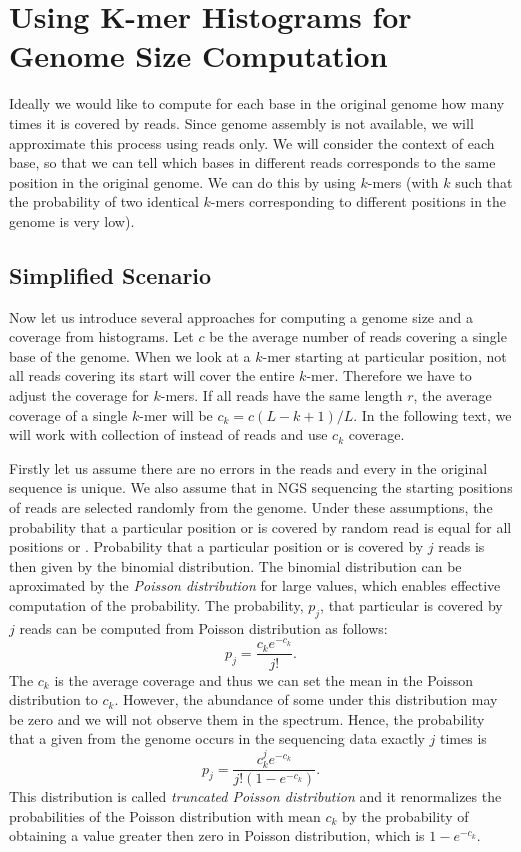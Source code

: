 \section[K-mer Histograms]{Using K-mer Histograms for Genome Size Computation}\label{sec:kmerhist}

Ideally we would like to compute for each base in the original genome how many times it is covered by reads. Since genome assembly is not available, we will approximate this process using reads only. We will consider the context of each base, so that we can tell which bases in different reads corresponds to the same position in the original genome. We can do this by using $k$-mers (with $k$ such that the probability of two identical $k$-mers corresponding to different positions in the genome is very low).

\subsection{Simplified Scenario}

Now let us introduce several approaches for computing a genome size and a coverage from \kmer histograms.
Let $c$ be the average number of reads covering a single base of the genome. When we look at a $k$-mer starting at particular position, not all reads covering its start will cover the entire $k$-mer.
Therefore we have to adjust the coverage for $k$-mers.
If all reads have the same length $r$, the average coverage of a single $k$-mer will be $c_k = c (L - k + 1)/L$.
In the following text, we will work with collection of \kmers instead of reads and use $c_k$ coverage.

Firstly let us assume there are no errors in the reads and every \kmer in the original sequence is unique.
We also assume that in NGS sequencing the starting positions of reads are selected randomly from the genome.
Under these assumptions, the probability that a particular position or \kmer is covered by random read is equal for all positions or \kmers. Probability that a particular position or \kmer is covered by $j$ reads is then given by the binomial distribution. The binomial distribution can be aproximated by the \emph{Poisson distribution} for large values, which enables effective computation of the probability.
The probability, $p_j$, that particular \kmer is covered by $j$ reads can be computed from Poisson distribution as follows:
$$ p_j =  \frac{c_k e^{-c_k}}{j!}.$$
The $c_k$ is the average coverage and thus we can set the mean in the Poisson distribution to $c_k$.
However, the abundance of some \kmers under this distribution may be zero and we will not observe them in the spectrum. Hence, the probability that a given \kmer from the genome occurs in the sequencing data exactly $j$ times is $$p_j = \frac{c_k^j e^{-c_k}}{j! (1-e^{-c_k})}.$$
This distribution is called \emph{truncated Poisson distribution} and it renormalizes the probabilities of the Poisson distribution with mean $c_k$ by the probability of obtaining a value greater then zero in Poisson distribution, which is $1-e^{-c_k}$.

